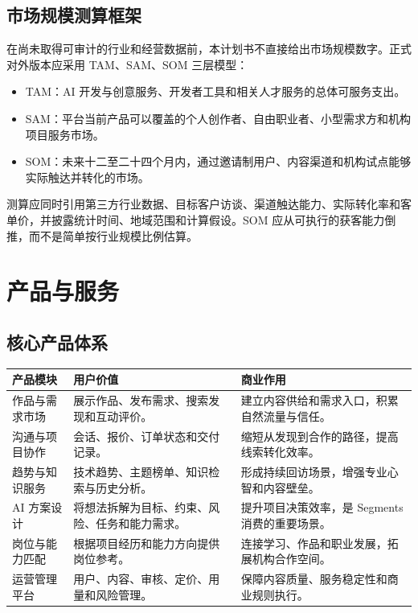 \documentclass[12pt,a4paper,openany,fontset=fandol]{ctexrep}
\begin{document}
\section{市场规模测算框架}

在尚未取得可审计的行业和经营数据前，本计划书不直接给出市场规模数字。正式对外版本应采用 TAM、SAM、SOM 三层模型：

\begin{itemize}
  \item TAM：AI 开发与创意服务、开发者工具和相关人才服务的总体可服务支出。
  \item SAM：平台当前产品可以覆盖的个人创作者、自由职业者、小型需求方和机构项目服务市场。
  \item SOM：未来十二至二十四个月内，通过邀请制用户、内容渠道和机构试点能够实际触达并转化的市场。
\end{itemize}

测算应同时引用第三方行业数据、目标客户访谈、渠道触达能力、实际转化率和客单价，并披露统计时间、地域范围和计算假设。SOM 应从可执行的获客能力倒推，而不是简单按行业规模比例估算。

\chapter{产品与服务}

\section{核心产品体系}

\begin{longtable}{p{3.2cm} p{5.1cm} p{5.4cm}}
\toprule
产品模块 & 用户价值 & 商业作用 \\
\midrule
作品与需求市场 & 展示作品、发布需求、搜索发现和互动评价。 & 建立内容供给和需求入口，积累自然流量与信任。 \\
沟通与项目协作 & 会话、报价、订单状态和交付记录。 & 缩短从发现到合作的路径，提高线索转化效率。 \\
趋势与知识服务 & 技术趋势、主题榜单、知识检索与历史分析。 & 形成持续回访场景，增强专业心智和内容壁垒。 \\
AI 方案设计 & 将想法拆解为目标、约束、风险、任务和能力需求。 & 提升项目决策效率，是 Segments 消费的重要场景。 \\
岗位与能力匹配 & 根据项目经历和能力方向提供岗位参考。 & 连接学习、作品和职业发展，拓展机构合作空间。 \\
运营管理平台 & 用户、内容、审核、定价、用量和风险管理。 & 保障内容质量、服务稳定性和商业规则执行。 \\
\bottomrule
\end{longtable}
\end{document}
